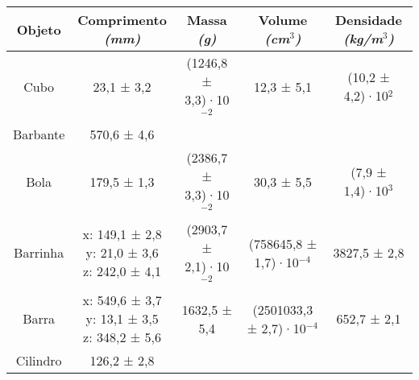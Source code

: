 \documentclass{article}
\begin{document}
\begin{table}[h!]
\centering
\begin{tabular}{c c c c c }
\toprule
Objeto & \shortstack{Comprimento\\\textit{(mm)}} & \shortstack{Massa\\\textit{(g)}} & \shortstack{Volume\\\textit{(cm$^3$)}} & \shortstack{Densidade\\\textit{(kg/m$^3$)}} \\
\midrule
Cubo & 23,1 ± 3,2 & (1246,8 ± 3,3)·10$^{-2}$ & 12,3 ± 5,1 & (10,2 ± 4,2)·10$^{2}$\\[5pt]
Barbante & 570,6 ± 4,6 & & & \\[5pt]
Bola & 179,5 ± 1,3 & (2386,7 ± 3,3)·10$^{-2}$ & 30,3 ± 5,5 & (7,9 ± 1,4)·10$^{3}$\\[5pt]
Barrinha & \shortstack{x: 149,1 ± 2,8\\y: 21,0 ± 3,6\\z: 242,0 ± 4,1} & (2903,7 ± 2,1)·10$^{-2}$ & (758645,8 ± 1,7)·10$^{-4}$ & 3827,5 ± 2,8\\[5pt]
Barra & \shortstack{x: 549,6 ± 3,7\\y: 13,1 ± 3,5\\z: 348,2 ± 5,6} & 1632,5 ± 5,4 & (2501033,3 ± 2,7)·10$^{-4}$ & 652,7 ± 2,1\\[5pt]
Cilindro & 126,2 ± 2,8 & & & \\[5pt]
\bottomrule
\end{tabular}
\end{table}
\end{document}
